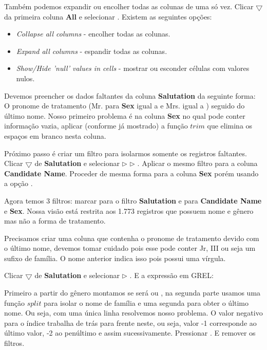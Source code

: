 \documentclass[a4paper,11pt]{article}
\begin{document}
Também podemos expandir ou encolher todas as colunas de uma só vez. Clicar $\bigtriangledown$ da primeira coluna \textbf{All} e selecionar . Existem as seguintes opções:
\begin{itemize}[nolistsep]
	\item \textit{Collapse all columns} - encolher todas as colunas.
	\item \textit{Expand all columns} - espandir todas as colunas.
	\item \textit{Show/Hide 'null' values in cells} - mostrar ou esconder células com valores nulos.
\end{itemize}	
	
Devemos preencher os dados faltantes da coluna \textbf{Salutation} da seguinte forma: O pronome de tratamento (Mr. para \textbf{Sex} igual a  e Mrs. igual a ) seguido do último nome. Nosso primeiro problema é na coluna \textbf{Sex} no qual pode conter informação vazia, aplicar (conforme já mostrado) a função $trim$ que elimina os espaços em branco nesta coluna.

Próximo passo é criar um filtro para isolarmos somente os registros faltantes. Clicar $\bigtriangledown$ de \textbf{Salutation} e selecionar  $\triangleright$  $\triangleright$ . Aplicar o mesmo filtro para a coluna \textbf{Candidate Name}. Proceder de mesma forma para a coluna \textbf{Sex} porém usando a opção .

Agora temos 3 filtros: marcar  para o filtro \textbf{Salutation} e  para \textbf{Candidate Name} e \textbf{Sex}. Nossa visão está restrita aos 1.773 registros que possuem nome e gênero mas não a forma de tratamento.

Precisamos criar uma coluna que contenha o pronome de tratamento devido com o último nome, devemos tomar cuidado pois esse pode conter Jr, III ou seja um sufixo de família. O nome anterior indica isso pois possui uma vírgula.

Clicar $\bigtriangledown$ de \textbf{Salutation} e selecionar  $\triangleright$ . E a expressão em GREL: \\

Primeiro a partir do gênero montamos se será  ou , na segunda parte usamos uma função $split$ para isolar o nome de família e uma segunda para obter o último nome. Ou seja, com uma única linha resolvemos nosso problema. O valor negativo para o índice trabalha de trás para frente neste, ou seja, valor -1 corresponde ao último valor, -2 ao penúltimo e assim sucessivamente. Pressionar . E remover os filtros.
\end{document}
